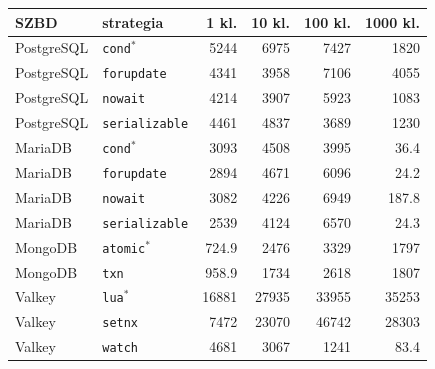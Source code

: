 \begin{tabular}{llrrrr}
\toprule
SZBD & strategia & 1 kl. & 10 kl. & 100 kl. & 1000 kl. \\
\midrule
PostgreSQL & \texttt{cond$^{*}$} & \num{5244} & \num{6975} & \num{7427} & \num{1820} \\
PostgreSQL & \texttt{forupdate} & \num{4341} & \num{3958} & \num{7106} & \num{4055} \\
PostgreSQL & \texttt{nowait} & \num{4214} & \num{3907} & \num{5923} & \num{1083} \\
PostgreSQL & \texttt{serializable} & \num{4461} & \num{4837} & \num{3689} & \num{1230} \\
MariaDB & \texttt{cond$^{*}$} & \num{3093} & \num{4508} & \num{3995} & \num{36.4} \\
MariaDB & \texttt{forupdate} & \num{2894} & \num{4671} & \num{6096} & \num{24.2} \\
MariaDB & \texttt{nowait} & \num{3082} & \num{4226} & \num{6949} & \num{187.8} \\
MariaDB & \texttt{serializable} & \num{2539} & \num{4124} & \num{6570} & \num{24.3} \\
MongoDB & \texttt{atomic$^{*}$} & \num{724.9} & \num{2476} & \num{3329} & \num{1797} \\
MongoDB & \texttt{txn} & \num{958.9} & \num{1734} & \num{2618} & \num{1807} \\
Valkey & \texttt{lua$^{*}$} & \num{16881} & \num{27935} & \num{33955} & \num{35253} \\
Valkey & \texttt{setnx} & \num{7472} & \num{23070} & \num{46742} & \num{28303} \\
Valkey & \texttt{watch} & \num{4681} & \num{3067} & \num{1241} & \num{83.4} \\
\bottomrule
\end{tabular}
